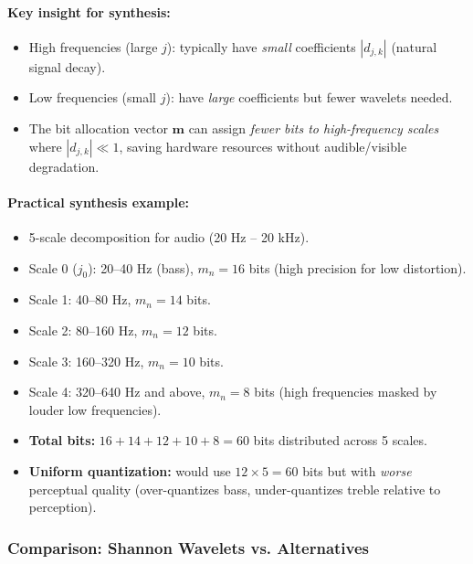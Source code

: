 \paragraph{Key insight for synthesis:}
\begin{itemize}
\item High frequencies (large $j$): typically have \emph{small} coefficients $|d_{j,k}|$ (natural signal decay).
\item Low frequencies (small $j$): have \emph{large} coefficients but fewer wavelets needed.
\item The bit allocation vector $\mathbf{m}$ can assign \emph{fewer bits to high-frequency scales} where $|d_{j,k}| \ll 1$, saving hardware resources without audible/visible degradation.
\end{itemize}

\paragraph{Practical synthesis example:}
\begin{itemize}
\item 5-scale decomposition for audio (20 Hz – 20 kHz).
\item Scale 0 ($j_0$): 20–40 Hz (bass), $m_n = 16$ bits (high precision for low distortion).
\item Scale 1: 40–80 Hz, $m_n = 14$ bits.
\item Scale 2: 80–160 Hz, $m_n = 12$ bits.
\item Scale 3: 160–320 Hz, $m_n = 10$ bits.
\item Scale 4: 320–640 Hz and above, $m_n = 8$ bits (high frequencies masked by louder low frequencies).
\item \textbf{Total bits:} $16 + 14 + 12 + 10 + 8 = 60$ bits distributed across 5 scales.
\item \textbf{Uniform quantization:} would use $12 \times 5 = 60$ bits but with \emph{worse} perceptual quality (over-quantizes bass, under-quantizes treble relative to perception).
\end{itemize}

\subsubsection{Comparison: Shannon Wavelets vs. Alternatives}

